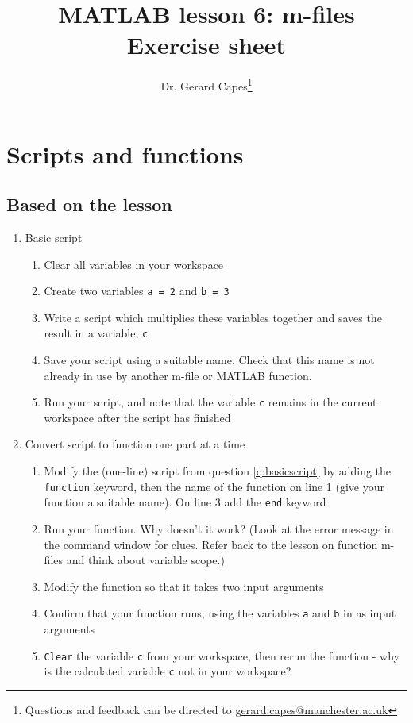 \documentclass{article}
\title{MATLAB lesson 6: m-files\\Exercise sheet}
\date{}
\author{Dr. Gerard Capes\thanks{Questions and feedback can be directed to \href{mailto:gerard.capes@manchester.ac.uk?subject=Feedback on MATLAB lesson 6 (m-files) exercise sheet}{gerard.capes@manchester.ac.uk}}}
\begin{document}
	\maketitle
	
	\section{Scripts and functions}
	\subsection*{Based on the lesson}
	\begin{enumerate}
		\item Basic script
		\label{q:basicscript}
		\begin{enumerate}
			\item Clear all variables in your workspace
			\item Create two variables \texttt{a = 2} and \texttt{b = 3}
			\item Write a script which multiplies these variables together and saves the result in a variable, \texttt{c}
			\item Save your script using a suitable name. Check that this name is not already in use by another m-file or MATLAB function.	
			\item Run your script, and note that the variable \texttt{c} remains in the current workspace after the script has finished
		\end{enumerate}
		\item Convert script to function one part at a time
		\begin{enumerate}
			\item Modify the (one-line) script from question \ref{q:basicscript} by adding the \texttt{function} keyword, then the name of the function on line 1 (give your function a suitable name). On line 3 add the \texttt{end} keyword
			\item Run your function. Why doesn't it work? (Look at the error message in the command window for clues. Refer back to the lesson on function m-files and think about variable scope.)
			\item Modify the function so that it takes two input arguments
			\item Confirm that your function runs, using the variables \texttt{a} and \texttt{b} in as input arguments
			\item \texttt{Clear} the variable \texttt{c} from your workspace, then rerun the function - why is the calculated variable \texttt{c} not in your workspace?

\end{enumerate}
\end{enumerate}
\end{document}
